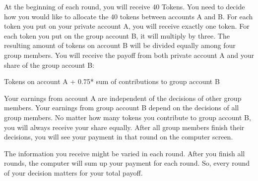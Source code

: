 \documentclass[12pt]{article}
\begin{document}
At the beginning of each round, you will receive 40 Tokens. You need to decide how you would like to allocate the 40 tokens between accounts A and B.  For each token you put on your private account A, you will receive exactly one token. For each token you put on the group account B, it will multiply by three. The resulting amount of tokens on account B will be divided equally among four group members. You will receive the payoff from both private account A and your share of the group account B:

Tokens on account A + 0.75* sum of contributions to group account B

Your earnings from account A are independent of the decisions of other group members. Your earnings from group account B depend on the decisions of all group members. No matter how many tokens you contribute to group account B, you will always receive your share equally. After all group members finish their decisions, you will see your payment in that round on the computer screen. 

The information you receive might be varied in each round. After you finish all rounds, the computer will sum up your payment for each round. So, every round of your decision matters for your total payoff.


\clearpage
\printbibliography


\end{document}

